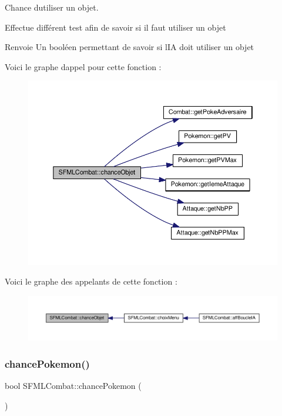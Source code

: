 Chance d\textquotesingle{}utiliser un objet. 

Effectue différent test afin de savoir si il faut utiliser un objet \begin{DoxyReturn}{Renvoie}
Un booléen permettant de savoir si l\textquotesingle{}IA doit utiliser un objet 
\end{DoxyReturn}
Voici le graphe d\textquotesingle{}appel pour cette fonction \+:\nopagebreak
\begin{figure}[H]
\begin{center}
\leavevmode
\includegraphics[width=350pt]{class_s_f_m_l_combat_a00370ff45d848befb5d35c52bd1db2d5_cgraph}
\end{center}
\end{figure}
Voici le graphe des appelants de cette fonction \+:\nopagebreak
\begin{figure}[H]
\begin{center}
\leavevmode
\includegraphics[width=350pt]{class_s_f_m_l_combat_a00370ff45d848befb5d35c52bd1db2d5_icgraph}
\end{center}
\end{figure}
\mbox{\label{class_s_f_m_l_combat_a4ba9a6e1f0c91eb425ac83649e443375}} 
\subsubsection{\texorpdfstring{chance\+Pokemon()}{chancePokemon()}}
{\footnotesize\ttfamily bool S\+F\+M\+L\+Combat\+::chance\+Pokemon (\begin{DoxyParamCaption}{ }\end{DoxyParamCaption})\hspace{0.3cm}{\ttfamily [private]}}



